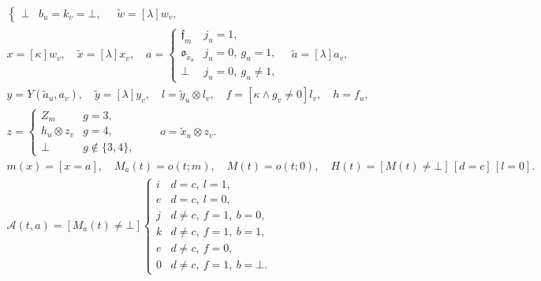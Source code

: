 \begin{gather}
\begin{cases}
 \bot&b_u=k_v=\bot,\end{cases}\quad \widetilde w=[\lambda]w_v,\\
 x=[\kappa]w_v,\quad\widetilde x=[\lambda]x_v,\quad
 a=\begin{cases}\mathfrak f_m&j_u=1,\\\mathfrak o_{\widetilde x_u}&j_u=0,\ g_u=1,\\
 \bot&j_u=0,\ g_u\ne1,\end{cases}
 \quad\widetilde a=[\lambda]a_v,\\
 y=Y(\widetilde a_u,a_v),\quad\widetilde y=[\lambda]y_v,\quad
 l=\widetilde y_u\otimes l_v,\quad f=[\kappa\land g_v\ne0]l_v,\quad h=f_u,\\
 z=\begin{cases}Z_m&g=3,\\h_u\otimes z_v&g=4,\\\bot&g\notin\{3,4\},\end{cases}
 \qquad o=\widetilde x_u\otimes z_v .\\
m(x)=[x=a],\quad M_a(t)=o(t;m),\quad M(t)=o(t;0),\quad
H(t)=[M(t)\ne\bot]\,[d=c]\,[l=0].\\
\mathcal A(t,a)=
[M_a(t)\ne\bot]\begin{cases}i&d=c,\ l=1,\\
e&d=c,\ l=0,\\
j&d\ne c,\ f=1,\ b=0,\\
k&d\ne c,\ f=1,\ b=1,\\
e&d\ne c,\ f=0,\\
0&d\ne c,\ f=1,\ b=\bot .
\end{cases}
\end{gather}
